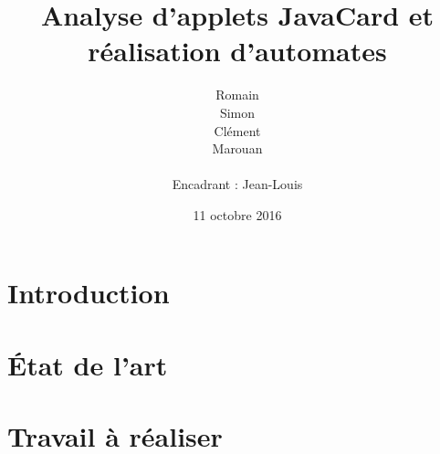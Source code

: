 \documentclass[a4paper, 11pt]{article}
\title{Analyse d'applets JavaCard et réalisation d'automates}
\author{Romain \bsc{Barrat} \\
  Simon \bsc{Garrelou} \\
  Clément \bsc{Jarrige} \\
  Marouan \bsc{Sami} \\
  ~\\
  Encadrant : Jean-Louis \bsc{Lanet}}
\date{11 octobre 2016}
\begin{document}
\maketitle

\section*{Introduction}


\section{État de l'art}


\section{Travail à réaliser}

\end{document}
